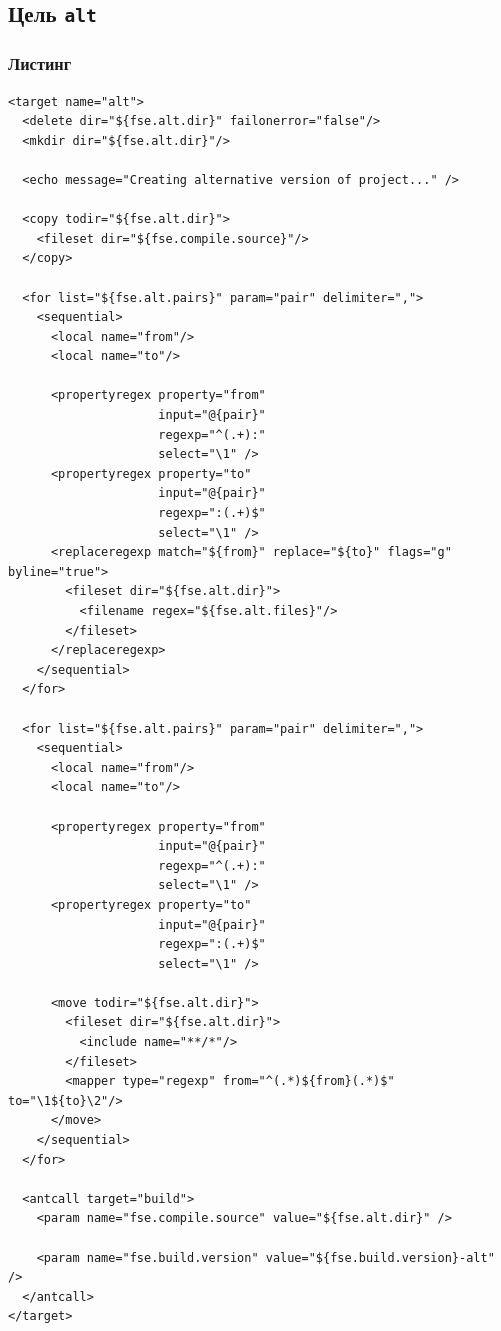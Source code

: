 \subsection{Цель \texttt{alt}}

\subsubsection{Листинг}

\begin{lstlisting}[caption={Часть содержимого файла \texttt{build.xml}},captionpos=b]
<target name="alt">
  <delete dir="${fse.alt.dir}" failonerror="false"/>
  <mkdir dir="${fse.alt.dir}"/>

  <echo message="Creating alternative version of project..." />

  <copy todir="${fse.alt.dir}">
    <fileset dir="${fse.compile.source}"/>
  </copy>

  <for list="${fse.alt.pairs}" param="pair" delimiter=",">
    <sequential>
      <local name="from"/>
      <local name="to"/>

      <propertyregex property="from"
                     input="@{pair}"
                     regexp="^(.+):"
                     select="\1" />
      <propertyregex property="to"
                     input="@{pair}"
                     regexp=":(.+)$"
                     select="\1" />
      <replaceregexp match="${from}" replace="${to}" flags="g" byline="true">
        <fileset dir="${fse.alt.dir}">
          <filename regex="${fse.alt.files}"/>
        </fileset>
      </replaceregexp>
    </sequential>
  </for>

  <for list="${fse.alt.pairs}" param="pair" delimiter=",">
    <sequential>
      <local name="from"/>
      <local name="to"/>

      <propertyregex property="from"
                     input="@{pair}"
                     regexp="^(.+):"
                     select="\1" />
      <propertyregex property="to"
                     input="@{pair}"
                     regexp=":(.+)$"
                     select="\1" />
      
      <move todir="${fse.alt.dir}">
        <fileset dir="${fse.alt.dir}">
          <include name="**/*"/>
        </fileset>
        <mapper type="regexp" from="^(.*)${from}(.*)$" to="\1${to}\2"/>
      </move>
    </sequential>
  </for>

  <antcall target="build">
    <param name="fse.compile.source" value="${fse.alt.dir}" />

    <param name="fse.build.version" value="${fse.build.version}-alt" />
  </antcall>
</target>
\end{lstlisting}

